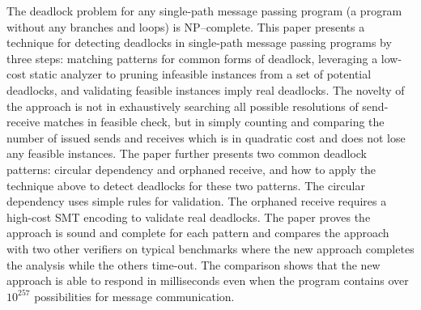 The deadlock problem for any single-path message passing program (a program without any branches and loops) is NP--complete. This paper presents a technique for detecting deadlocks in single-path message passing programs by three steps: matching patterns for common forms of deadlock, leveraging a low-cost static analyzer to pruning infeasible instances from a set of potential deadlocks, and validating feasible instances imply real deadlocks.
The novelty of the approach is not in exhaustively searching all possible resolutions of send-receive matches in feasible check, but in simply counting and comparing the number of issued sends and receives which is in quadratic cost and does not lose any feasible instances. The paper further presents two common deadlock patterns: circular dependency and orphaned receive, and how to apply the technique above to detect deadlocks for these two patterns. 
The circular dependency uses simple rules for validation. The orphaned receive requires a high-cost SMT encoding to validate real deadlocks. 
The paper proves the approach is sound and complete for each pattern and compares the approach with two other verifiers on typical benchmarks where the new approach completes the analysis while the others time-out. The comparison shows that the new approach is able to respond in milliseconds even when the program contains over $10^{257}$ possibilities for message communication.
